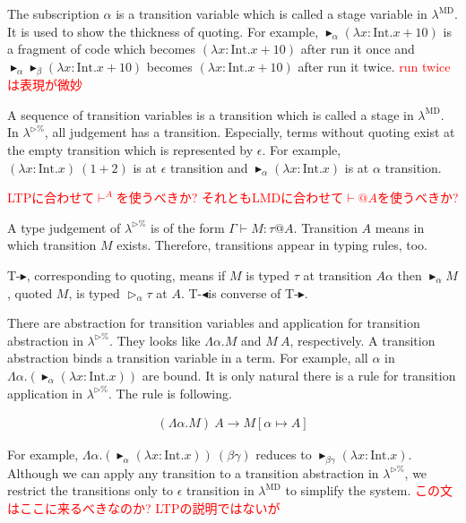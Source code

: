\documentclass[runningheads]{llncs}
\newcommand{\red}[1]{\textcolor{red}{#1 }}
\newcommand{\LTP}{$\lambda^{\triangleright\%}$\xspace}
\newcommand{\LMD}{$\lambda^{\textrm{MD}}$\xspace}
\newcommand{\G}{\Gamma}
\newcommand{\TW}{\triangleright}
\newcommand{\TB}{\blacktriangleright}
\newcommand{\TBL}{\blacktriangleleft}
\newcommand{\TTB}{\textsc{T-$\TB$}}
\newcommand{\TTBL}{\textsc{T-$\TBL$}}
\newcommand{\I}{\textrm{Int}}
\begin{document}

The subscription $\alpha$ is a transition variable which is called a stage variable in \LMD.
It is used to show the thickness of quoting.
For example, $\TB_\alpha (\lambda x:\I.x+10)$ is a fragment of code which becomes $(\lambda x:\I.x+10)$ after run it once and
$\TB_\alpha \TB_\beta (\lambda x:\I.x+10)$ becomes $(\lambda x:\I.x+10)$ after run it twice.
\red{run twiceは表現が微妙}


A sequence of transition variables is a transition which is called a stage in \LMD.
In \LTP, all judgement has a transition.
Especially, terms without quoting exist at the empty transition which is represented by $\epsilon$.
For example, $(\lambda x:\I.x)\ (1+2)$ is at $\epsilon$ transition and 
$\TB_\alpha (\lambda x:\I.x)$ is at $\alpha$ transition.


\red{LTPに合わせて$\vdash^A$を使うべきか? それともLMDに合わせて$\vdash @ A$を使うべきか?}

A type judgement of \LTP is of the form $\G \vdash M : \tau @ A$.
Transition $A$ means in which transition $M$ exists.
Therefore, transitions appear in typing rules, too.
\begin{center}
	\infrule{\G\vdash M:\tau@{A\alpha}}{\G\vdash \TB_{\alpha}M:\TW_{\alpha}\tau@A}{\TTB} \andalso
	\infrule{\G\vdash M:\TW_{\alpha}\tau@A}{\G\vdash \TBL_{\alpha}M:\tau@{A\alpha}}{\TTBL}
\end{center}
\TTB, corresponding to quoting, means 
if $M$ is typed $\tau$ at transition $A\alpha$ then $\TB_{\alpha}M$, quoted $M$, is typed $\TW_{\alpha}\tau$ at $A$.
\TTBL is converse of \TTB.


There are abstraction for transition variables and application for transition abstraction in \LTP.
They looks like $\Lambda\alpha.M$ and $M\ A$, respectively.
A transition abstraction binds a transition variable in a term.
For example, all $\alpha$ in $\Lambda\alpha.(\TB_\alpha (\lambda x:\I.x))$ are bound.
It is only natural there is a rule for transition application in \LTP.
The rule is following.

\begin{align*}
	(\Lambda\alpha.M)\ A \longrightarrow M[\alpha\mapsto A]
\end{align*}

For example, $\Lambda\alpha.(\TB_\alpha (\lambda x:\I.x))\ (\beta\gamma)$ reduces to $\TB_{\beta\gamma} (\lambda x:\I.x)$.
Although we can apply any transition to a transition abstraction in \LTP,
we restrict the transitions only to $\epsilon$ transition in \LMD to simplify the system.
\red{この文はここに来るべきなのか? LTPの説明ではないが}
\end{document}
